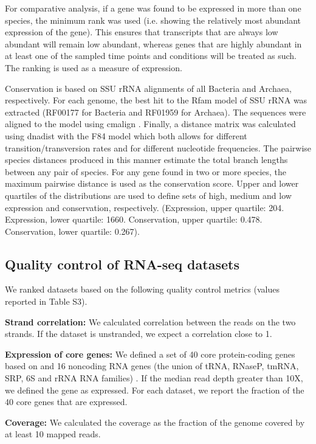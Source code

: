 \documentclass[10pt]{article}
\begin{document}
For comparative analysis, if a gene was found to be expressed in more
than one species, the minimum rank was used (i.e. showing the
relatively most abundant expression of the gene). This ensures that
transcripts that are always low abundant will remain low abundant,
whereas genes that are highly abundant in at least one of the sampled
time points and conditions will be treated as such. The ranking is
used as a measure of expression.

Conservation is based on SSU rRNA alignments of all Bacteria and
Archaea, respectively. For each genome, the best hit to the Rfam model
of SSU rRNA was extracted (RF00177 for Bacteria and RF01959 for
Archaea). The sequences were aligned to the model using cmalign
\cite{Nawrocki:2013}. Finally, a distance matrix was calculated using
dnadist \cite{FELS05} with the F84 model
\cite{Kishino:1989,Felsenstein:1996} which both allows for different
transition/transversion rates and for different nucleotide
frequencies. The pairwise species distances produced in this manner
estimate the total branch lengths between any pair of species. For any
gene found in two or more species, the maximum pairwise distance is
used as the conservation score. Upper and lower quartiles of the
distributions are used to define sets of high, medium and low
expression and conservation, respectively. (Expression, upper
quartile: 204. Expression, lower quartile: 1660. Conservation, upper
quartile: 0.478. Conservation, lower quartile: 0.267).

\subsection*{Quality control of RNA-seq datasets}

We ranked datasets based on the following quality control metrics
(values reported in Table S3).
	
{\bf Strand correlation:} We calculated correlation between the reads
on the two strands. If the dataset is unstranded, we expect a
correlation close to 1.
	
{\bf Expression of core genes:} We defined a set of 40 core
protein-coding genes based on \cite{Wu:2013} and 16 noncoding RNA
genes (the union of tRNA, RNaseP, tmRNA, SRP, 6S and rRNA RNA
families) \cite{Gardner:2011,Burge:2013}. If the median read depth
greater than 10X, we defined the gene as expressed. For each dataset,
we report the fraction of the 40 core genes that are expressed.
	
{\bf Coverage:} We calculated the coverage as the fraction of the
genome covered by at least 10 mapped reads.
	
\end{document}
